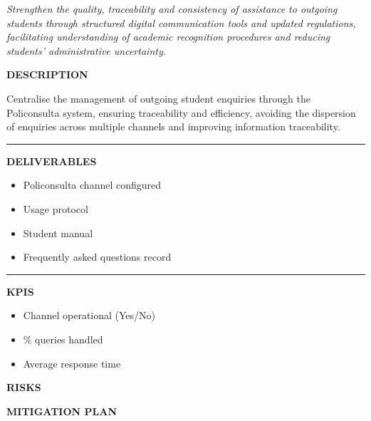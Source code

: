 \documentclass[11pt,a4paper]{scrreprt}
\newcommand{\fieldlabel}[1]{%
  {\footnotesize\sffamily\bfseries\color{mutedcolor}\MakeUppercase{#1}}\par\nopagebreak[4]
}
\newcommand{\fieldsep}{\vspace{3pt}\noindent\textcolor{bordercolor}{\rule{\linewidth}{0.4pt}}\vspace{3pt}\par}
\begin{document}
\newpage
{}
{\small\color{mutedcolor}\itshape Strengthen the quality, traceability and consistency of assistance to outgoing students through structured digital communication tools and updated regulations, facilitating understanding of academic recognition procedures and reducing students' administrative uncertainty. }\par\vspace{6pt}

\begin{tcolorbox}[pabox={fgcolor}{A.P.2.1 \enspace\textbullet\enspace Implementation of Policonsulta as a Communication Tool}]

\fieldlabel{Description}
{\small Centralise the management of outgoing student enquiries through the Policonsulta system, ensuring traceability and efficiency, avoiding the dispersion of enquiries across multiple channels and improving information traceability. }\par
\fieldsep
\fieldlabel{Deliverables}
{\small \begin{itemize}[noitemsep,topsep=2pt]
\item Policonsulta channel configured
\item Usage protocol
\item Student manual
\item Frequently asked questions record
\end{itemize}}\par
\fieldsep
\fieldlabel{KPIs}
{\small \begin{itemize}[noitemsep,topsep=2pt]
\item Channel operational (Yes/No)
\item \% queries handled
\item Average response time
\end{itemize}}\par
\end{tcolorbox}
\begin{tcolorbox}[riskbox]
{\footnotesize\sffamily\bfseries\color{red!50!black} RISKS}\par{}
\end{tcolorbox}
\begin{tcolorbox}[mitbox]
{\footnotesize\sffamily\bfseries\color{green!40!black} MITIGATION PLAN}\par{}
\end{tcolorbox}
\vspace{8pt}
\end{document}
